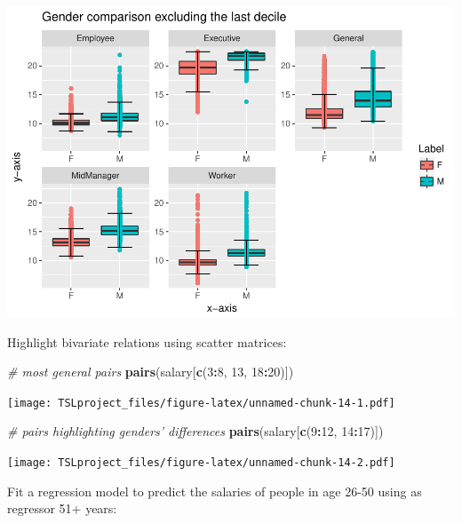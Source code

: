 \documentclass[]{article}
\newenvironment{Shaded}{\begin{snugshade}}{\end{snugshade}}
\newcommand{\KeywordTok}[1]{\textcolor[rgb]{0.13,0.29,0.53}{\textbf{#1}}}
\newcommand{\DecValTok}[1]{\textcolor[rgb]{0.00,0.00,0.81}{#1}}
\newcommand{\StringTok}[1]{\textcolor[rgb]{0.31,0.60,0.02}{#1}}
\newcommand{\CommentTok}[1]{\textcolor[rgb]{0.56,0.35,0.01}{\textit{#1}}}
\newcommand{\OperatorTok}[1]{\textcolor[rgb]{0.81,0.36,0.00}{\textbf{#1}}}
\newcommand{\NormalTok}[1]{#1}
\begin{document}
\includegraphics{TSLproject_files/figure-latex/unnamed-chunk-13-2.pdf}

Highlight bivariate relations using scatter matrices:

\begin{Shaded}
\begin{Highlighting}[]
\CommentTok{# most general pairs}
\KeywordTok{pairs}\NormalTok{(salary[}\KeywordTok{c}\NormalTok{(}\DecValTok{3}\OperatorTok{:}\DecValTok{8}\NormalTok{, }\DecValTok{13}\NormalTok{, }\DecValTok{18}\OperatorTok{:}\DecValTok{20}\NormalTok{)])}
\end{Highlighting}
\end{Shaded}

\texttt{[image: TSLproject\_files/figure-latex/unnamed-chunk-14-1.pdf]}

\begin{Shaded}
\begin{Highlighting}[]
\CommentTok{# pairs highlighting genders' differences}
\KeywordTok{pairs}\NormalTok{(salary[}\KeywordTok{c}\NormalTok{(}\DecValTok{9}\OperatorTok{:}\DecValTok{12}\NormalTok{, }\DecValTok{14}\OperatorTok{:}\DecValTok{17}\NormalTok{)])}
\end{Highlighting}
\end{Shaded}

\texttt{[image: TSLproject\_files/figure-latex/unnamed-chunk-14-2.pdf]}

Fit a regression model to predict the salaries of people in age 26-50
using as regressor 51+ years:

\begin{Shaded}
\end{Shaded}
\end{document}
